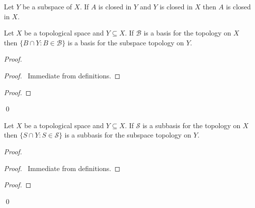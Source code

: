 \begin{cor}
  \label{cor:topology:subspace:closed2}
  Let $Y$ be a subspace of $X$. If $A$ is closed in $Y$ and $Y$ is closed in
  $X$
  then $A$ is closed in $X$.
\end{cor}

\begin{lm}
  \label{lm:topology:subspace:basis}
  Let $X$ be a topological space and $Y \subseteq X$. If $\mathcal{B}$ is a
  basis for the topology on $X$ then $\{ B \cap Y : B \in \mathcal{B} \}$ is
  a
  basis for the subspace topology on $Y$.
\end{lm}

\begin{proof}
  \pf
  \begin{proof}
    \pf\ Immediate from definitions.
  \end{proof}
  \begin{proof}
  \end{proof}
  \qed
\end{proof}

\begin{lm}
  \label{lm:topology:subspace:subbasis}
  Let $X$ be a topological space and $Y \subseteq X$. If $\mathcal{S}$ is a
  subbasis for the topology on $X$ then $\{ S \cap Y : S \in \mathcal{S} \}$
  is
  a subbasis for the subspace topology on $Y$.
\end{lm}

\begin{proof}
  \pf
  \begin{proof}
    \pf\ Immediate from definitions.
  \end{proof}
  \begin{proof}
  \end{proof}
  \qed
\end{proof}

